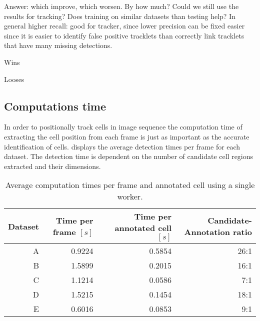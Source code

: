 		
		Answer: which improve, which worsen. By how much? Could we still use the results for tracking?
		Does training on similar datasets than testing help? In general higher recall: good for tracker, since lower precision can be fixed easier since it is easier to identify false positive tracklets than correctly link tracklets that have many missing detections.
		
		Wins
			
		Looses
	\subsection{Computations time \statusnew}
	
		In order to positionally track cells in image sequence the computation time of extracting the cell position from each frame is just as important as the accurate identification of cells.  displays the average detection times per frame for each dataset. The detection time is dependent on the number of candidate cell regions extracted and their dimensions.
		
		
		
		
		
		\begin{table}[h]
			\centering
			\begin{tabular}{rrrr}
				Dataset & Time per frame  $\left[ s \right]$ & Time per annotated cell  $\left[ s \right]$ & Candidate-Annotation ratio \\
			\hline
				      A &                             0.9224 &                                      0.5854 &                       26:1 \\
				      B &                             1.5899 &                                      0.2015 &                       16:1 \\
				      C &                             1.1214 &                                      0.0586 &                        7:1 \\
				      D &                             1.5215 &                                      0.1454 &                       18:1 \\
				      E &                             0.6016 &                                      0.0853 &                        9:1
			\end{tabular} 
			\caption{Average computation times per frame and annotated cell using a single worker.}
			\label{tab:results_detector_speed}
		\end{table}
		
